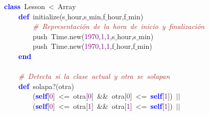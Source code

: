 \noindent
\mbox{}\textbf{\textcolor{Blue}{class}}\ Lesson\ \textcolor{BrickRed}{\textless{}}\ Array \\
\mbox{}\ \ \ \ \textbf{\textcolor{Blue}{def}}\ initialize\textcolor{BrickRed}{(}s$\_$hour\textcolor{BrickRed}{,}s$\_$min\textcolor{BrickRed}{,}f$\_$hour\textcolor{BrickRed}{,}f$\_$min\textcolor{BrickRed}{)} \\
\mbox{}\ \ \ \ \ \ \ \ \textit{\textcolor{Brown}{\#\ Representación\ de\ la\ hora\ de\ inicio\ y\ finalización}} \\
\mbox{}\ \ \ \ \ \ \ \ push\ Time\textcolor{BrickRed}{.}new\textcolor{BrickRed}{(}\textcolor{Purple}{1970}\textcolor{BrickRed}{,}\textcolor{Purple}{1}\textcolor{BrickRed}{,}\textcolor{Purple}{1}\textcolor{BrickRed}{,}s$\_$hour\textcolor{BrickRed}{,}s$\_$min\textcolor{BrickRed}{)} \\
\mbox{}\ \ \ \ \ \ \ \ push\ Time\textcolor{BrickRed}{.}new\textcolor{BrickRed}{(}\textcolor{Purple}{1970}\textcolor{BrickRed}{,}\textcolor{Purple}{1}\textcolor{BrickRed}{,}\textcolor{Purple}{1}\textcolor{BrickRed}{,}f$\_$hour\textcolor{BrickRed}{,}f$\_$min\textcolor{BrickRed}{)} \\
\mbox{}\ \ \ \ \textbf{\textcolor{Blue}{end}} \\
\mbox{}\ \ \ \  \\
\mbox{}\ \ \ \ \textit{\textcolor{Brown}{\#\ Detecta\ si\ la\ clase\ actual\ y\ otra\ se\ solapan}} \\
\mbox{}\ \ \ \ \textbf{\textcolor{Blue}{def}}\ solapa?\textcolor{BrickRed}{(}otra\textcolor{BrickRed}{)} \\
\mbox{}\ \ \ \ \ \ \ \ \textcolor{BrickRed}{(}\textbf{\textcolor{Blue}{self}}\textcolor{BrickRed}{[}\textcolor{Purple}{0}\textcolor{BrickRed}{]}\ \textcolor{BrickRed}{\textless{}=}\ otra\textcolor{BrickRed}{[}\textcolor{Purple}{0}\textcolor{BrickRed}{]}\ \textcolor{BrickRed}{\&\&}\ otra\textcolor{BrickRed}{[}\textcolor{Purple}{0}\textcolor{BrickRed}{]}\ \textcolor{BrickRed}{\textless{}=}\ \textbf{\textcolor{Blue}{self}}\textcolor{BrickRed}{[}\textcolor{Purple}{1}\textcolor{BrickRed}{])}\ \textcolor{BrickRed}{$|$$|$}\  \\
\mbox{}\ \ \ \ \ \ \ \ \textcolor{BrickRed}{(}\textbf{\textcolor{Blue}{self}}\textcolor{BrickRed}{[}\textcolor{Purple}{0}\textcolor{BrickRed}{]}\ \textcolor{BrickRed}{\textless{}=}\ otra\textcolor{BrickRed}{[}\textcolor{Purple}{1}\textcolor{BrickRed}{]}\ \textcolor{BrickRed}{\&\&}\ otra\textcolor{BrickRed}{[}\textcolor{Purple}{1}\textcolor{BrickRed}{]}\ \textcolor{BrickRed}{\textless{}=}\ \textbf{\textcolor{Blue}{self}}\textcolor{BrickRed}{[}\textcolor{Purple}{1}\textcolor{BrickRed}{])}\ \textcolor{BrickRed}{$|$$|$} \\
